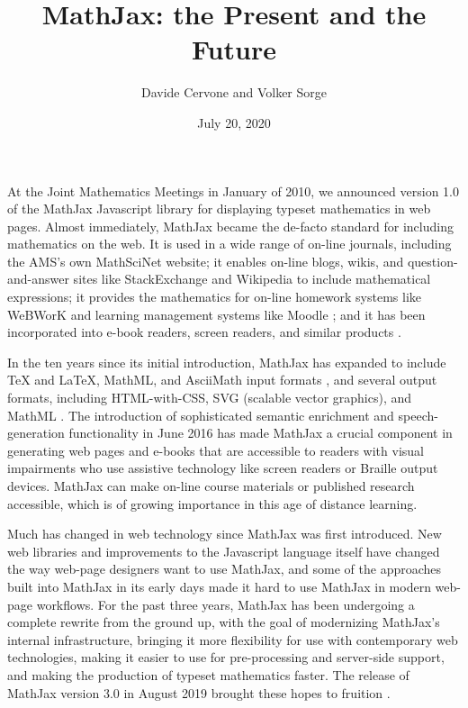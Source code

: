 \documentclass[11pt]{article} %
\title{MathJax: the Present and the Future}
\author{Davide Cervone and Volker Sorge}
\date{July 20, 2020}
\begin{document}
\maketitle

At the Joint Mathematics Meetings in January of 2010, we announced
version 1.0 of the MathJax Javascript library for displaying typeset
mathematics in web pages.  Almost immediately, MathJax became the
de-facto standard for including mathematics on the web.  It is used in
a wide range of on-line journals, including the AMS's own MathSciNet
\cite{MathSciNet} website; it enables on-line blogs, wikis, and
question-and-answer sites like StackExchange \cite{StackExchange} and
Wikipedia \cite{Wikipedia} to include mathematical expressions; it
provides the mathematics for on-line homework systems like WeBWorK
\cite{WeBWorK} and learning management systems like Moodle
\cite{Moodle}; and it has been incorporated into e-book readers,
screen readers, and similar products \cite{MJ-use}.

In the ten years since its initial introduction, MathJax has expanded
to include {\TeX} and {\LaTeX}, MathML, and AsciiMath input formats
\cite{MJ-input}, and several output formats, including HTML-with-CSS,
SVG (scalable vector graphics), and MathML \cite{MJ-output}.  The
introduction of sophisticated semantic enrichment and
speech-generation functionality in June 2016 \cite{MJ-accessibility}
has made MathJax a crucial component in generating web pages and
e-books that are accessible to readers with visual impairments who use
assistive technology like screen readers or Braille output devices.
MathJax can make on-line course materials or published research
accessible, which is of growing importance in this age of distance
learning.

Much has changed in web technology since MathJax was first introduced.
New web libraries and improvements to the Javascript language itself
have changed the way web-page designers want to use MathJax, and some
of the approaches built into MathJax in its early days made it hard to
use MathJax in modern web-page workflows.  For the past three years,
MathJax has been undergoing a complete rewrite from the ground up,
with the goal of modernizing MathJax’s internal infrastructure,
bringing it more flexibility for use with contemporary web
technologies, making it easier to use for pre-processing and
server-side support, and making the production of typeset mathematics
faster.  The release of MathJax version 3.0 in August 2019 brought
these hopes to fruition \cite{MJ3}.
\end{document}
